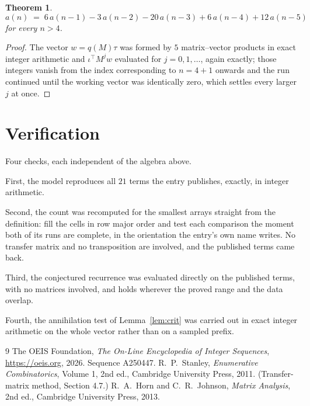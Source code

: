 \documentclass[11pt,a4paper]{article}
\theoremstyle{plain}
\newtheorem{theorem}{Theorem}
\theoremstyle{definition}
\begin{document}
\begin{theorem}
\[
a(n)\;=\;6\,a(n-1) - 3\,a(n-2) - 20\,a(n-3) + 6\,a(n-4) + 12\,a(n-5)
\]
for every $n>4$.
\end{theorem}

\begin{proof}
The vector $w=q(M)\tau$ was formed by $5$ matrix--vector products in exact integer
arithmetic and $\iota^{\!\top}M^{j}w$ evaluated for $j=0,1,\dots$, again exactly; those
integers vanish from the index corresponding to $n=4+1$ onwards and the run continued
until the working vector was identically zero, which settles every larger $j$ at once.
\end{proof}

\section{Verification}

Four checks, each independent of the algebra above.

First, the model reproduces all $21$ terms the entry publishes, exactly, in integer
arithmetic.

Second, the count was recomputed for the smallest arrays straight from the definition: fill the
cells in row major order and test each comparison the moment both of its runs are complete,
in the orientation the entry's own name writes. No transfer matrix and no transposition are
involved, and the published terms came back.

Third, the conjectured recurrence was evaluated directly on the published terms, with no
matrices involved, and holds wherever the proved range and the data overlap.

Fourth, the annihilation test of Lemma~\ref{lem:crit} was carried out in exact integer
arithmetic on the whole vector rather than on a sampled prefix.

\begin{thebibliography}{9}
 The OEIS Foundation, \emph{The On-Line Encyclopedia of Integer
Sequences}, \url{https://oeis.org}, 2026. Sequence A250447.
 R.~P.~Stanley, \emph{Enumerative Combinatorics}, Volume 1, 2nd ed.,
Cambridge University Press, 2011. (Transfer-matrix method, Section 4.7.)
 R.~A.~Horn and C.~R.~Johnson, \emph{Matrix Analysis}, 2nd ed., Cambridge
University Press, 2013.
\end{thebibliography}
\end{document}
